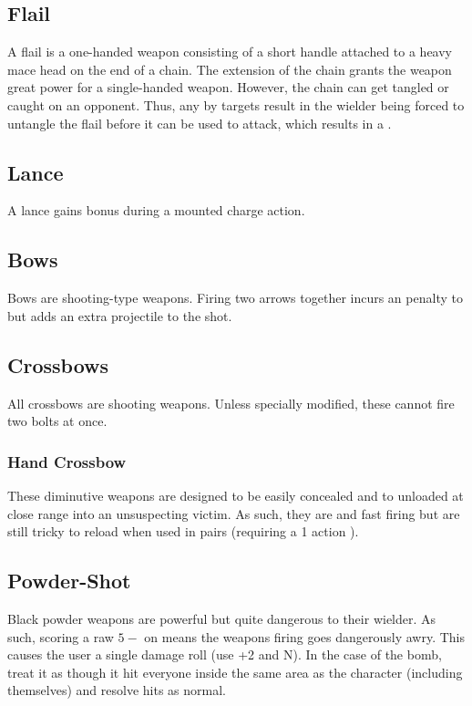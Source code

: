 \subsection{Flail}
A flail is a one-handed weapon consisting of a short handle attached to a heavy mace head on the end of a chain. The extension of the chain grants the weapon great power for a single-handed weapon. However, the chain can get tangled or caught on an opponent. Thus, any   by targets result in the wielder being forced to untangle the flail before it can be used to attack, which results in a . 

\subsection{Lance}
A lance gains bonus  during a mounted charge action.

\subsection{Bows}
Bows are shooting-type weapons. Firing two arrows together incurs an  penalty to  but adds an extra projectile to the shot.


\subsection{Crossbows}
All crossbows are shooting weapons. Unless specially modified, these cannot fire two bolts at once.

\subsubsection{Hand Crossbow}
These diminutive weapons are designed to be easily concealed and to unloaded at close range into an unsuspecting victim. As such, they are  and fast firing but are still tricky to reload when used in pairs (requiring a 1 action ).

\subsection{Powder-Shot}
Black powder weapons are powerful but quite dangerous to their wielder. As such, scoring a raw $5-$ on  means the weapons firing goes dangerously awry. This causes the user a single damage roll (use  +2 and  N). In the case of the bomb, treat it as though it hit everyone inside the same area as the character (including themselves) and resolve hits as normal.

